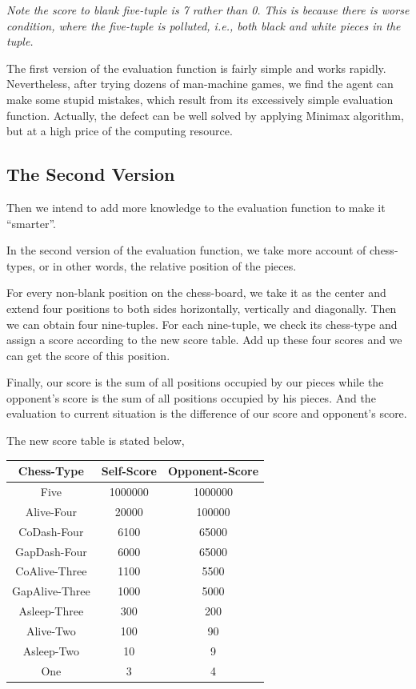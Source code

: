 \documentclass[12pt,a4paper]{article}
\begin{document}
\noindent\begin{small}\emph{Note the score to blank five-tuple is 7 rather than 0. This is because there is worse condition, where the five-tuple is polluted, i.e., both black and white pieces in the tuple.}\end{small}

The first version of the evaluation function is fairly simple and works rapidly. Nevertheless, after trying dozens of man-machine games, we find the agent can make some stupid mistakes, which result from its excessively simple evaluation function. Actually, the defect can be well solved by applying Minimax algorithm, but at a high price of the computing resource.
\subsection{The Second Version}
Then we intend to add more knowledge to the evaluation function to make it ``smarter''.

In the second version of the evaluation function, we take more account of chess-types, or in other words, the relative position of the pieces.

For every non-blank position on the chess-board, we take it as the center and extend four positions to both sides horizontally, vertically and diagonally. Then we can obtain four nine-tuples. For each nine-tuple, we check its chess-type and assign a score according to the new score table. Add up these four scores and we can get the score of this position.

Finally, our score is the sum of all positions occupied by our pieces while the opponent's score is the sum of all positions occupied by his pieces. And the evaluation to current situation is the difference of our score and opponent's score.

The new score table is stated below,
\begin{table}[h]
\centering
\begin{tabular}{c|c|c}
\hline
Chess-Type&Self-Score&Opponent-Score  \\
\hline
Five&1000000&1000000\\
Alive-Four&20000&100000\\
CoDash-Four&6100&65000\\
GapDash-Four&6000&65000\\
CoAlive-Three&1100&5500\\
GapAlive-Three&1000&5000\\
Asleep-Three&300&200\\
Alive-Two&100&90\\
Asleep-Two&10&9\\
One&3&4\\
\hline
\end{tabular}
\end{table}
\end{document}

